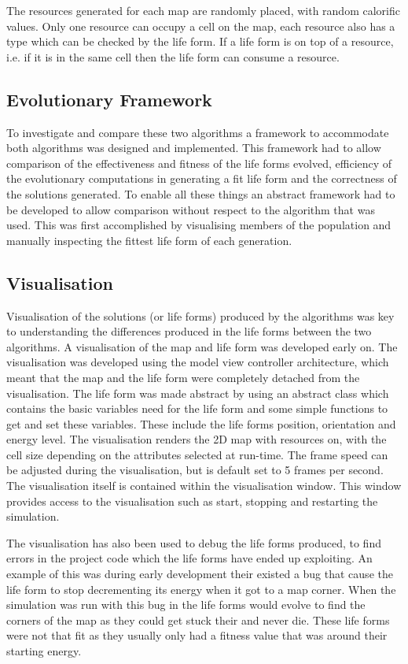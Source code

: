 \documentclass[12pt]{article}
\begin{document}
The resources generated for each map are randomly placed, with random calorific values. Only one resource can occupy a cell on the map, each resource also has
a type which can be checked by the life form. If a life form is on top of a resource, i.e. if it is in the same cell then the life form can consume a resource. 
 

\subsection{Evolutionary Framework}
To investigate and compare these two algorithms a framework to accommodate both algorithms was designed and implemented. This framework had to allow comparison
of the effectiveness and fitness of the life forms evolved, efficiency of the 
evolutionary computations in generating a fit life form and the correctness of the solutions generated. To enable all these things an abstract framework had 
to be developed to allow comparison without respect to the algorithm that was used. This was first accomplished by visualising members of the population and 
manually inspecting the fittest life form of each generation. 


\subsection{Visualisation}
Visualisation of the solutions (or life forms) produced by the algorithms was key
to understanding the differences produced in the life forms between the two algorithms. A visualisation of the map and life form
was developed early on. The visualisation was developed using the model view controller architecture,
which meant that the map and the life form were completely detached from the visualisation.
The life form was made abstract by using an abstract class which contains the basic variables need for the life
form and some simple functions to get and set these variables. These include the life forms position, orientation
and energy level. The visualisation renders the 2D map with resources on, with the cell size depending on the 
attributes selected at run-time. The frame speed can be adjusted during the visualisation, but is default set to 5 frames per second. The visualisation itself is contained within the visualisation window. This window
provides access to the visualisation such as start, stopping and restarting the simulation.

The visualisation has also been used to debug the life forms produced, to find errors in the project code which the life forms have ended up exploiting. An example
of this was during early development their existed a bug that cause the life form to stop decrementing its energy when it got to a map corner. When the simulation
was run with this bug in the life forms would evolve to find the corners of the map as they could get stuck their and never die. These 
life forms were not that fit as they usually only had a fitness value that was around their starting energy.
\end{document}
